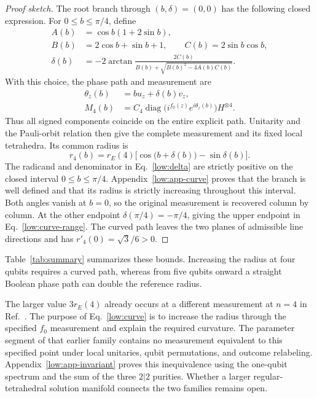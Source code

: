 \begin{proof}[Proof sketch]
The root branch through $(b,\delta)=(0,0)$ has the following closed
expression.  For $0\le b\le\pi/4$, define
\begin{align}
 A(b)&=\cos b(1+2\sin b),\nonumber\\
 B(b)&=2\cos b+\sin b+1,\qquad
 C(b)=2\sin b\cos b,\nonumber\\
 \delta(b)&=-2\arctan\frac{2C(b)}
 {B(b)+\sqrt{B(b)^2-4A(b)C(b)}}.
 \label{low:delta}
\end{align}
With this choice, the phase path and measurement are
\begin{equation}
 \begin{aligned}
 \theta_z(b)&=bu_z+\delta(b)v_z,\\
 M_4(b)&=C_4\operatorname{diag}
 \bigl(i^{f_0(z)}e^{i\theta_z(b)}\bigr)H^{\otimes4}.
 \end{aligned}
 \label{low:curve}
\end{equation}
Thus all signed components coincide on the entire explicit path.
Unitarity and the Pauli-orbit relation then give the complete measurement
and its fixed local tetrahedra.  Its common radius is
\begin{equation}
 r_4(b)=r_E(4)\bigl[\cos\bigl(b+\delta(b)\bigr)-\sin\delta(b)\bigr].
 \label{low:curve-radius}
\end{equation}
The radicand and denominator in Eq.~\eqref{low:delta} are strictly
positive on the closed interval $0\le b\le\pi/4$.
Appendix~\ref{low:app-curve} proves that the branch is well defined and
that its radius is strictly increasing throughout this interval.
Both angles vanish at $b=0$, so the original measurement is recovered
column by column.  At the other endpoint $\delta(\pi/4)=-\pi/4$, giving
the upper endpoint in Eq.~\eqref{low:curve-range}.
The curved path leaves the two planes of admissible line directions and
has $r'_4(0)=\sqrt3/6>0$.
\end{proof}

Table~\ref{tab:summary} summarizes these bounds. Increasing the radius at four qubits requires a curved path, whereas from five qubits onward a straight Boolean phase path can double the reference radius.


The larger value $3r_E(4)$ already occurs at a different measurement at $n=4$ in Ref.~\cite{PauwelsGisin2026}.  The purpose of
Eq.~\eqref{low:curve} is to increase the radius through the specified
$f_0$ measurement and explain the required curvature.  The parameter
segment of that earlier family contains no measurement equivalent to
this specified point under local unitaries, qubit permutations, and
outcome relabeling.  Appendix~\ref{low:app-invariant} proves this inequivalence using the one-qubit spectrum and the sum of the three
$2|2$ purities.  Whether a larger regular-tetrahedral solution manifold
connects the two families remains open.
